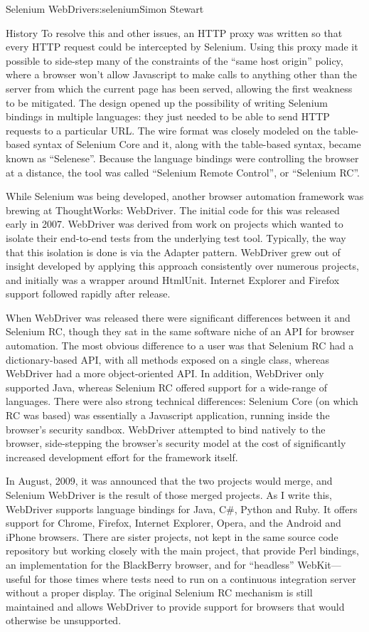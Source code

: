 \begin{aosachapter}{Selenium WebDriver}{s:selenium}{Simon Stewart}
\begin{aosasect1}{History}
To resolve this and other issues, an HTTP proxy was written so that
every HTTP request could be intercepted by Selenium. Using this
proxy made it possible to side-step many of the constraints of the ``same host
origin'' policy, where a browser won't allow Javascript to make calls
to anything other than the server from which the current page has been
served, allowing the first weakness to be mitigated. The design opened
up the possibility of writing Selenium bindings in multiple languages:
they just needed to be able to send HTTP requests to a particular
URL\@. The wire format was closely modeled on the table-based syntax of
Selenium Core and it, along with the table-based syntax, became
known as ``Selenese''. Because the language bindings were controlling
the browser at a distance, the tool was called ``Selenium Remote
Control'', or ``Selenium RC''.

While Selenium was being developed, another browser automation
framework was brewing at ThoughtWorks: WebDriver. The initial code for
this was released early in 2007. WebDriver was derived from work on
projects which wanted to isolate their end-to-end tests from the
underlying test tool.  Typically, the way that this isolation is done
is via the Adapter pattern.  WebDriver grew out of insight
developed by applying this approach consistently over numerous
projects, and initially was a wrapper around HtmlUnit. Internet
Explorer and Firefox support followed rapidly after release.

When WebDriver was released there were significant differences between
it and Selenium RC, though they sat in the same software niche of an
API for browser automation.  The most obvious difference to a user was
that Selenium RC had a dictionary-based API, with all methods exposed
on a single class, whereas WebDriver had a more object-oriented API\@.
In addition, WebDriver only supported Java, whereas Selenium RC
offered support for a wide-range of languages.  There were also strong
technical differences: Selenium Core (on which RC was based) was
essentially a Javascript application, running inside the browser's
security sandbox. WebDriver attempted to bind natively to the browser,
side-stepping the browser's security model at the cost of
significantly increased development effort for the framework itself.

In August, 2009, it was announced that the two projects would merge,
and Selenium WebDriver is the result of those merged projects.
As I write this, WebDriver supports language bindings for Java, C\#,
Python and Ruby. It offers support for Chrome, Firefox, Internet
Explorer, Opera, and the Android and iPhone browsers. There are sister
projects, not kept in the same source code repository but working
closely with the main project, that provide Perl bindings, an
implementation for the BlackBerry browser, and for ``headless''
WebKit---useful for those times where tests need to run on a
continuous integration server without a proper display. The original
Selenium RC mechanism is still maintained and allows WebDriver to
provide support for browsers that would otherwise be unsupported.


\end{aosasect1}
\end{aosachapter}
